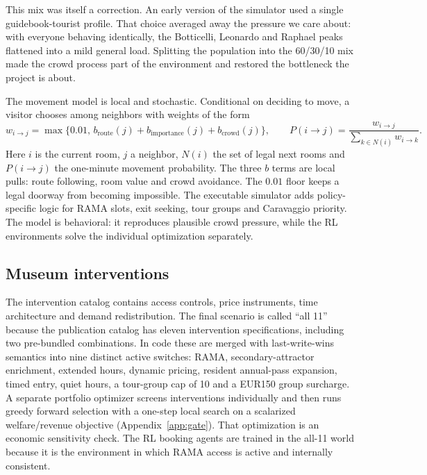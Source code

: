 \documentclass[11pt]{article}
\begin{document}
This mix was itself a correction. An early version of the simulator used a single guidebook-tourist
profile. That choice averaged away the pressure we care about: with everyone behaving identically,
the Botticelli, Leonardo and Raphael peaks flattened into a mild general load. Splitting the
population into the 60/30/10 mix made the crowd process part of the environment and restored the
bottleneck the project is about.

The movement model is local and stochastic. Conditional on deciding to move, a visitor chooses among
neighbors with weights of the form
\[
w_{i\to j}=\max\{0.01,\, b_{\text{route}}(j)+b_{\text{importance}}(j)+b_{\text{crowd}}(j)\},
\qquad
P(i\to j)=\frac{w_{i\to j}}{\sum_{k\in N(i)} w_{i\to k}}.
\]
Here $i$ is the current room, $j$ a neighbor, $N(i)$ the set of legal next rooms and $P(i\to j)$ the
one-minute movement probability. The three $b$ terms are local pulls: route following, room value and
crowd avoidance. The $0.01$ floor keeps a legal doorway from becoming impossible. The executable
simulator adds policy-specific logic for RAMA slots, exit seeking, tour groups and Caravaggio priority.
The model is behavioral: it reproduces plausible crowd pressure, while the RL environments solve the
individual optimization separately.

\subsection{Museum interventions}

The intervention catalog contains access controls, price instruments, time architecture and demand
redistribution. The final scenario is called ``all 11'' because the publication catalog has eleven
intervention specifications, including two pre-bundled combinations. In code these are merged with
last-write-wins semantics into nine distinct active switches: RAMA, secondary-attractor enrichment,
extended hours, dynamic pricing, resident annual-pass expansion, timed entry, quiet hours, a
tour-group cap of 10 and a EUR150 group surcharge. A separate portfolio optimizer screens
interventions individually and then runs greedy forward selection with a one-step local search on a
scalarized welfare/revenue objective (Appendix~\ref{app:gate}). That optimization is an economic
sensitivity check. The RL booking agents are trained in the all-11 world because it is the environment
in which RAMA access is active and internally consistent.
\end{document}
